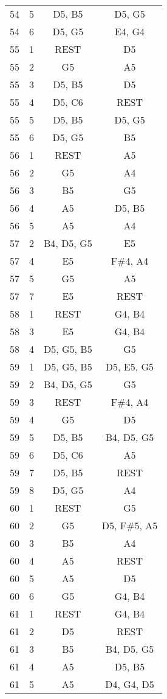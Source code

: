 \documentclass{article}
\begin{document}
\begin{longtable}{|c|c|c|c|}
54 & 5 & D5, B5 & D5, G5 \\ 
54 & 6 & D5, G5 & E4, G4 \\ 
\hline
55 & 1 & REST & D5 \\ 
55 & 2 & G5 & A5 \\ 
55 & 3 & D5, B5 & D5 \\ 
55 & 4 & D5, C6 & REST \\ 
55 & 5 & D5, B5 & D5, G5 \\ 
55 & 6 & D5, G5 & B5 \\ 
\hline
56 & 1 & REST & A5 \\ 
56 & 2 & G5 & A4 \\ 
56 & 3 & B5 & G5 \\ 
56 & 4 & A5 & D5, B5 \\ 
56 & 5 & A5 & A4 \\ 
\hline
57 & 2 & B4, D5, G5 & E5 \\ 
57 & 4 & E5 & F\#4, A4 \\ 
57 & 5 & G5 & A5 \\ 
57 & 7 & E5 & REST \\ 
\hline
58 & 1 & REST & G4, B4 \\ 
58 & 3 & E5 & G4, B4 \\ 
58 & 4 & D5, G5, B5 & G5 \\ 
\hline
59 & 1 & D5, G5, B5 & D5, E5, G5 \\ 
59 & 2 & B4, D5, G5 & G5 \\ 
59 & 3 & REST & F\#4, A4 \\ 
59 & 4 & G5 & D5 \\ 
59 & 5 & D5, B5 & B4, D5, G5 \\ 
59 & 6 & D5, C6 & A5 \\ 
59 & 7 & D5, B5 & REST \\ 
59 & 8 & D5, G5 & A4 \\ 
\hline
60 & 1 & REST & G5 \\ 
60 & 2 & G5 & D5, F\#5, A5 \\ 
60 & 3 & B5 & A4 \\ 
60 & 4 & A5 & REST \\ 
60 & 5 & A5 & D5 \\ 
60 & 6 & G5 & G4, B4 \\ 
\hline
61 & 1 & REST & G4, B4 \\ 
61 & 2 & D5 & REST \\ 
61 & 3 & B5 & B4, D5, G5 \\ 
61 & 4 & A5 & D5, B5 \\ 
61 & 5 & A5 & D4, G4, D5 \\ 

\end{longtable}
\end{document}
